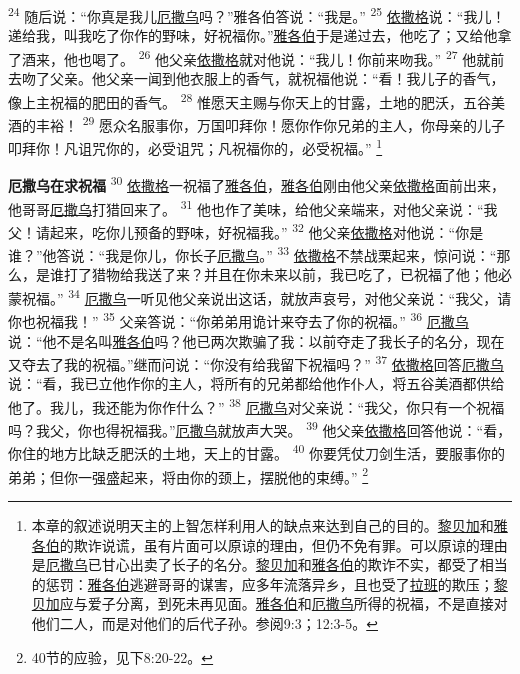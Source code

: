 \textsuperscript{24}
随后说：“你真是我儿\uline{厄撒乌}吗？”雅各伯答说：“我是。”
\textsuperscript{25}
\uline{依撒格}说：“我儿！递给我，叫我吃了你作的野味，好祝福你。”\uline{雅各伯}于是递过去，他吃了；又给他拿了酒来，他也喝了。
\textsuperscript{26}
他父亲\uline{依撒格}就对他说：“我儿！你前来吻我。”
\textsuperscript{27}
他就前去吻了父亲。他父亲一闻到他衣服上的香气，就祝福他说：“看！我儿子的香气，像上主祝福的肥田的香气。
\textsuperscript{28}
惟愿天主赐与你天上的甘露，土地的肥沃，五谷美酒的丰裕！
\textsuperscript{29}
愿众名服事你，万国叩拜你！愿你作你兄弟的主人，你母亲的儿子叩拜你！凡诅咒你的，必受诅咒；凡祝福你的，必受祝福。”
\footnote{本章的叙述说明天主的上智怎样利用人的缺点来达到自己的目的。\uline{黎贝加}和\uline{雅各伯}的欺诈说谎，虽有片面可以原谅的理由，但仍不免有罪。可以原谅的理由是\uline{厄撒乌}已甘心出卖了长子的名分。\uline{黎贝加}和\uline{雅各伯}的欺诈不实，都受了相当的惩罚：\uline{雅各伯}逃避哥哥的谋害，应多年流落异乡，且也受了\uline{拉班}的欺压；\uline{黎贝加}应与爱子分离，到死未再见面。\uline{雅各伯}和\uline{厄撒乌}所得的祝福，不是直接对他们二人，而是对他们的后代子孙。参阅9:3；12:3-5。}

\textbf{厄撒乌在求祝福\quad}
\textsuperscript{30}
\uline{依撒格}一祝福了\uline{雅各伯}，\uline{雅各伯}刚由他父亲\uline{依撒格}面前出来，他哥哥\uline{厄撒乌}打猎回来了。
\textsuperscript{31}
他也作了美味，给他父亲端来，对他父亲说：“我父！请起来，吃你儿预备的野味，好祝福我。”
\textsuperscript{32}
他父亲\uline{依撒格}对他说：“你是谁？”他答说：“我是你儿，你长子\uline{厄撒乌}。”
\textsuperscript{33}
\uline{依撒格}不禁战栗起来，惊问说：“那么，是谁打了猎物给我送了来？并且在你未来以前，我已吃了，已祝福了他；他必蒙祝福。”
\textsuperscript{34}
\uline{厄撒乌}一听见他父亲说出这话，就放声哀号，对他父亲说：“我父，请你也祝福我！”
\textsuperscript{35}
父亲答说：“你弟弟用诡计来夺去了你的祝福。”
\textsuperscript{36}
\uline{厄撒乌}说：“他不是名叫\uline{雅各伯}吗？他已两次欺骗了我：以前夺走了我长子的名分，现在又夺去了我的祝福。”继而问说：“你没有给我留下祝福吗？”
\textsuperscript{37}
\uline{依撒格}回答\uline{厄撒乌}说：“看，我已立他作你的主人，将所有的兄弟都给他作仆人，将五谷美酒都供给他了。我儿，我还能为你作什么？”
\textsuperscript{38}
\uline{厄撒乌}对父亲说：“我父，你只有一个祝福吗？我父，你也得祝福我。”\uline{厄撒乌}就放声大哭。
\textsuperscript{39}
他父亲\uline{依撒格}回答他说：“看，你住的地方比缺乏肥沃的土地，天上的甘露。
\textsuperscript{40}
你要凭仗刀剑生活，要服事你的弟弟；但你一强盛起来，将由你的颈上，摆脱他的束缚。”
\footnote{40节的应验，见下8:20-22。}

